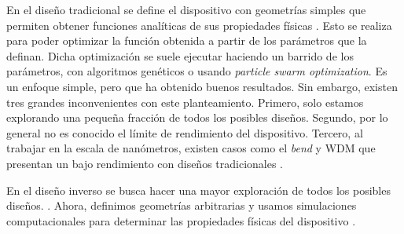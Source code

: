 En el diseño tradicional se define el dispositivo con geometrías simples que permiten obtener funciones analíticas de sus propiedades físicas \citep{Hughes2016, Song2008}. 
Esto se realiza para poder optimizar la función obtenida a partir de los parámetros que la definan. 
Dicha optimización se suele ejecutar haciendo un barrido de los parámetros, con algoritmos genéticos o usando \emph{particle swarm optimization}. 
Es un enfoque simple, pero que ha obtenido buenos resultados. 
Sin embargo, existen tres grandes inconvenientes con este planteamiento. 
Primero,  solo estamos explorando una pequeña fracción de todos los posibles diseños.
Segundo, por lo general no es conocido el límite de rendimiento del dispositivo.
Tercero, al trabajar en la escala de nanómetros, existen casos como el \emph{bend} y WDM que presentan un bajo rendimiento con diseños tradicionales \citep{Molesky2018, Su2020}.


En el diseño inverso se busca hacer una mayor exploración de todos los posibles diseños. 
. 
Ahora, definimos geometrías arbitrarias y usamos simulaciones computacionales para determinar las propiedades físicas del dispositivo \citep{Molesky2018, Su2020}. 



